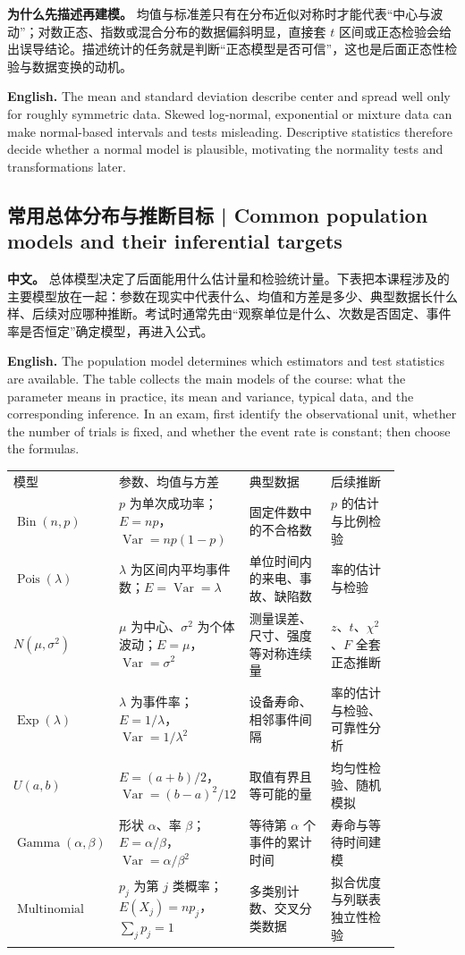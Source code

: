 \documentclass[UTF8,11pt,a4paper]{ctexart}
\newcommand{\EN}[1]{\par\noindent\textbf{English.} #1\par}
\newcommand{\APS}[2]{\par\noindent\textbf{中文。} #1\par\noindent\textbf{English.} #2\par\smallskip}
\begin{document}
\noindent\textbf{为什么先描述再建模。} 均值与标准差只有在分布近似对称时才能代表“中心与波动”；对数正态、指数或混合分布的数据偏斜明显，直接套 $t$ 区间或正态检验会给出误导结论。描述统计的任务就是判断“正态模型是否可信”，这也是后面正态性检验与数据变换的动机。
\EN{The mean and standard deviation describe center and spread well only for roughly symmetric data. Skewed log-normal, exponential or mixture data can make normal-based intervals and tests misleading. Descriptive statistics therefore decide whether a normal model is plausible, motivating the normality tests and transformations later.}

\subsection{常用总体分布与推断目标 | Common population models and their inferential targets}
\APS{总体模型决定了后面能用什么估计量和检验统计量。下表把本课程涉及的主要模型放在一起：参数在现实中代表什么、均值和方差是多少、典型数据长什么样、后续对应哪种推断。考试时通常先由“观察单位是什么、次数是否固定、事件率是否恒定”确定模型，再进入公式。}{The population model determines which estimators and test statistics are available. The table collects the main models of the course: what the parameter means in practice, its mean and variance, typical data, and the corresponding inference. In an exam, first identify the observational unit, whether the number of trials is fixed, and whether the event rate is constant; then choose the formulas.}

\begin{center}
\small
\begin{tabular}{p{0.18\linewidth}p{0.29\linewidth}p{0.21\linewidth}p{0.18\linewidth}}
模型 & 参数、均值与方差 & 典型数据 & 后续推断\\
$\operatorname{Bin}(n,p)$ & $p$ 为单次成功率；$E=np$，$\operatorname{Var}=np(1-p)$ & 固定件数中的不合格数 & $p$ 的估计与比例检验\\
$\operatorname{Pois}(\lambda)$ & $\lambda$ 为区间内平均事件数；$E=\operatorname{Var}=\lambda$ & 单位时间内的来电、事故、缺陷数 & 率的估计与检验\\
$N(\mu,\sigma^2)$ & $\mu$ 为中心、$\sigma^2$ 为个体波动；$E=\mu$，$\operatorname{Var}=\sigma^2$ & 测量误差、尺寸、强度等对称连续量 & $z$、$t$、$\chi^2$、$F$ 全套正态推断\\
$\operatorname{Exp}(\lambda)$ & $\lambda$ 为事件率；$E=1/\lambda$，$\operatorname{Var}=1/\lambda^2$ & 设备寿命、相邻事件间隔 & 率的估计与检验、可靠性分析\\
$U(a,b)$ & $E=(a+b)/2$，$\operatorname{Var}=(b-a)^2/12$ & 取值有界且等可能的量 & 均匀性检验、随机模拟\\
$\operatorname{Gamma}(\alpha,\beta)$ & 形状 $\alpha$、率 $\beta$；$E=\alpha/\beta$，$\operatorname{Var}=\alpha/\beta^2$ & 等待第 $\alpha$ 个事件的累计时间 & 寿命与等待时间建模\\
$\operatorname{Multinomial}$ & $p_j$ 为第 $j$ 类概率；$E(X_j)=np_j$，$\sum_jp_j=1$ & 多类别计数、交叉分类数据 & 拟合优度与列联表独立性检验\\
\end{tabular}
\end{center}
\end{document}
